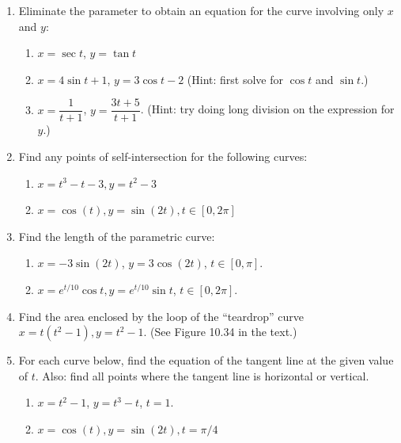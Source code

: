 \documentclass[12pt]{article}
\begin{document}
 \begin{enumerate}
\item Eliminate the parameter to obtain an equation for the curve involving only $x$ and $y$:
\begin{enumerate}
 \item $x=\sec t$, $y=\tan t$
 \item $x=4\sin t+1$, $y=3\cos t-2$ (Hint: first solve for $\cos t$ and $\sin t$.)
 \item $x=\dfrac{1}{t+1}$, $y=\dfrac{3t+5}{t+1}$. (Hint: try doing long division on the expression for $y$.)

\end{enumerate}

\vspace{3.5in}

\item Find any points of self-intersection for the following curves:
\begin{enumerate}
\item $x=t^3-t-3, y=t^2-3$
\item $x=\cos(t), y=\sin(2t), t\in [0,2\pi]$
\end{enumerate}

\newpage

 \item Find the length of the parametric curve:
\begin{enumerate}
 \item $x=-3\sin(2t)$, $y=3\cos(2t)$, $t\in [0,\pi]$.
 \item $x=e^{t/10}\cos t, y=e^{t/10}\sin t$, $t\in [0,2\pi]$.
\end{enumerate}

\vspace{4in}

 \item Find the area enclosed by the loop of the ``teardrop'' curve $x=t(t^2-1), y=t^2-1$. (See Figure 10.34 in the text.)


\newpage

\item For each curve below, find the equation of the tangent line at the given value of $t$. Also: find all points where the tangent line is horizontal or vertical.
\begin{enumerate}
\item $x=t^2-1$, $y=t^3-t$, $t=1$.

\vspace{3.5in}

\item $x=\cos(t), y=\sin(2t), t=\pi/4$
\end{enumerate}
\end{enumerate}
\end{document}
